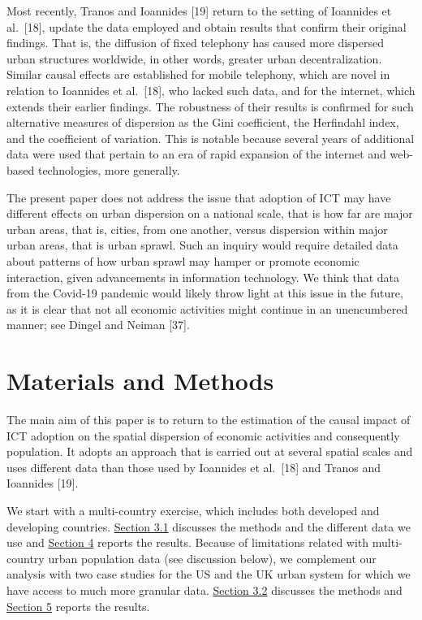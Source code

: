 \documentclass[10pt,letterpaper]{article}
\begin{document}
Most recently, Tranos and Ioannides {[}19{]} return to the setting of
Ioannides et al.~{[}18{]}, update the data employed and obtain results
that confirm their original findings. That is, the diffusion of fixed
telephony has caused more dispersed urban structures worldwide, in other
words, greater urban decentralization. Similar causal effects are
established for mobile telephony, which are novel in relation to
Ioannides et al.~{[}18{]}, who lacked such data, and for the internet,
which extends their earlier findings. The robustness of their results is
confirmed for such alternative measures of dispersion as the Gini
coefficient, the Herfindahl index, and the coefficient of variation.
This is notable because several years of additional data were used that
pertain to an era of rapid expansion of the internet and web-based
technologies, more generally.

The present paper does not address the issue that adoption of ICT may
have different effects on urban dispersion on a national scale, that is
how far are major urban areas, that is, cities, from one another, versus
dispersion within major urban areas, that is urban sprawl. Such an
inquiry would require detailed data about patterns of how urban sprawl
may hamper or promote economic interaction, given advancements in
information technology. We think that data from the Covid-19 pandemic
would likely throw light at this issue in the future, as it is clear
that not all economic activities might continue in an unencumbered
manner; see Dingel and Neiman {[}37{]}.

\hypertarget{sec3}{%
\section{Materials and Methods}\label{sec3}}

The main aim of this paper is to return to the estimation of the causal
impact of ICT adoption on the spatial dispersion of economic activities
and consequently population. It adopts an approach that is carried out
at several spatial scales and uses different data than those used by
Ioannides et al.~{[}18{]} and Tranos and Ioannides {[}19{]}.

We start with a multi-country exercise, which includes both developed
and developing countries. \protect\hyperlink{sec3.1}{Section 3.1}
discusses the methods and the different data we use and
\protect\hyperlink{sec4}{Section 4} reports the results. Because of
limitations related with multi-country urban population data (see
discussion below), we complement our analysis with two case studies for
the US and the UK urban system for which we have access to much more
granular data. \protect\hyperlink{sec3.2}{Section 3.2} discusses the
methods and \protect\hyperlink{sec5}{Section 5} reports the results.
\end{document}
